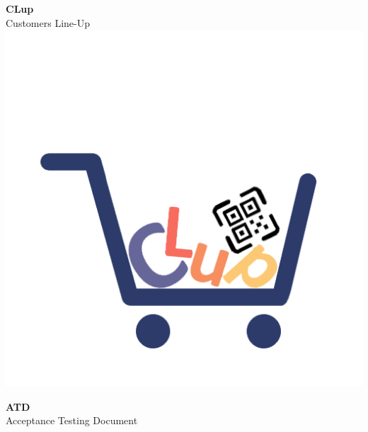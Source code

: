 



\begin{titlepage}
  \begin{center}

    \HUGE \textbf{CLup} \\[0.5cm]
    \LARGE Customers Line-Up \\[0.5cm]
    \hspace*{-1.2cm}\includegraphics[scale=0.5]{../logo/clup_logo_nobg.png}

    \vfill

    \Huge \textbf{ATD} \\
    \LARGE Acceptance Testing Document \\[2cm]


\end{center}
\end{titlepage}
